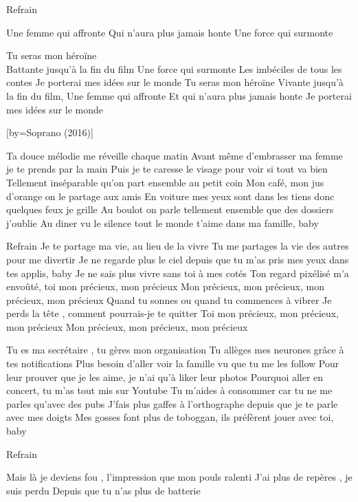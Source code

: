 \beginverse
Refrain
\endverse

\beginverse
Une femme qui affronte
Qui n’aura plus jamais honte
Une force qui surmonte
\endverse

\beginverse
Tu seras mon héroïne \\[héroïne]
Battante jusqu’à la fin du film
Une force qui surmonte
Les imbéciles de tous les contes
Je porterai mes idées sur le monde
Tu seras mon héroïne
Vivante jusqu’à la fin du film,
Une femme qui affronte
Et qui n’aura plus jamais honte
Je porterai mes idées sur le monde
\endverse

[by={Soprano (2016)}]

\beginverse
Ta douce mélodie me réveille chaque matin
Avant même d'embrasser ma femme je te prends par la main
Puis je te caresse le visage pour voir si tout va bien
Tellement inséparable qu'on part ensemble au petit coin
Mon café, mon jus d'orange on le partage aux amis
En voiture mes yeux sont dans les tiens donc quelques feux je grille
Au boulot on parle tellement ensemble que des dossiers j'oublie
Au diner vu le silence tout le monde t'aime dans ma famille, baby
\endverse

\beginverse
Refrain
Je te partage ma vie, au lieu de la vivre
Tu me partages la vie des autres pour me divertir
Je ne regarde plus le ciel depuis que tu m'as pris mes yeux dans tes applis, baby
Je ne sais plus vivre sans toi à mes cotés
Ton regard pixélisé m'a envoûté, toi mon précieux, mon précieux Mon précieux, mon précieux, mon précieux, mon précieux
Quand tu sonnes ou quand tu commences à vibrer
Je perds la tête , comment pourrais-je te quitter
Toi mon précieux, mon précieux, mon précieux
Mon précieux, mon précieux, mon précieux
\endverse

\beginverse
Tu es ma secrétaire , tu gères mon organisation
Tu allèges mes neurones grâce à tes notifications
Plus besoin d'aller voir la famille vu que tu me les follow
Pour leur prouver que je les aime, je n'ai qu'à liker leur photos
Pourquoi aller en concert, tu m'as tout mis sur Youtube
Tu m'aides à consommer car tu ne me parles qu'avec des pubs
J'fais plus gaffes à l'orthographe depuis que je te parle avec mes doigts
Mes gosses font plus de toboggan, ils préfèrent jouer avec toi, baby
\endverse

\beginverse
Refrain
\endverse

\beginverse
Mais là je deviens fou , l'impression que mon pouls ralenti
J'ai plus de repères , je suis perdu
Depuis que tu n'as plus de batterie
\endverse


